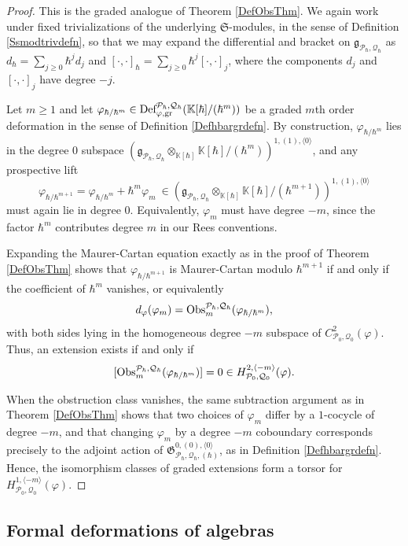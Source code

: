 \documentclass[11pt]{amsart}
\numberwithin{equation}{section}
\theoremstyle{definition}
\newcommand{\bb}{\mathbb}
\newcommand{\mc}{\mathcal}
\newcommand{\mf}{\mathfrak}
\newcommand{\Def}{{\textup{Def}}}
\newcommand{\Ph}{{\mathcal{P}_\hbar}}
\newcommand{\Qh}{{\mathcal{Q}_\hbar}}
\newcommand{\Kh}{{\K[\hbar]}}
\newcommand{\gd}{{\textup{gr}}}
\newcommand{\K}{{\bb K}}
\newcommand{\Obs}{{\textup{Obs}}}
\newcommand{\Ss}{{{\mf{S}}}}
\newcommand{\0}{{\textbf{0}}}
\newcommand{\g}{{\mf{g}}}
\def \mf{\mathfrak}
\begin{document}
\begin{proof}
	This is the graded analogue of Theorem \ref{DefObsThm}. We again work under fixed trivializations of the underlying $\Ss$-modules, in the sense of Definition \ref{Ssmodtrivdefn}, so that we may expand the differential and bracket on $\g_{\Ph,\Qh}$ as $d_\hbar=\sum_{j\ge 0}\hbar^j d_j$ and $[\cdot,\cdot]_\hbar = \sum_{j\ge 0}\hbar^j[\cdot,\cdot]_j$, where the components $d_j$ and $[\cdot,\cdot]_j$ have degree $-j$.
	
	Let $m\ge 1$ and let $\varphi_{\hbar/\hbar^m}\in \Def^{\Ph,\Qh}_{\varphi,\gd}(\Kh/(\hbar^m))$ be a graded $m$th order deformation in the sense of Definition \ref{Defhbargrdefn}. By construction,
	$\varphi_{\hbar/\hbar^m}$ lies in the degree $0$ subspace $(\g_{\Ph,\Qh}\otimes_{\Kh}\Kh/(\hbar^m))^{1,(1),\langle 0\rangle}$,
	and any prospective lift
	\[
	\varphi_{\hbar/\hbar^{m+1}}=\varphi_{\hbar/\hbar^m}+\hbar^m\varphi_m \ \in (\g_{\Ph,\Qh}\otimes_{\Kh}\Kh/(\hbar^{m+1}))^{1,(1),\langle 0\rangle}
	\]
 must again lie in degree $0$. Equivalently, $\varphi_m$ must have degree $-m$, since the factor $\hbar^m$ contributes degree $m$ in our Rees conventions.
	
	Expanding the Maurer-Cartan equation exactly as in the proof of Theorem \ref{DefObsThm} shows that
	$\varphi_{\hbar/\hbar^{m+1}}$ is Maurer-Cartan modulo $\hbar^{m+1}$ if and only if the coefficient
	of $\hbar^m$ vanishes, or equivalently
	\[
	d_\varphi(\varphi_m)=\Obs^{\Ph,\Qh}_m(\varphi_{\hbar/\hbar^m}),
	\]
	with both sides lying in the homogeneous degree $-m$ subspace of $C^2_{\mc P_0,\mc Q_0}(\varphi)$. Thus, an extension exists if and only if
	\[
	[\Obs^{\Ph,\Qh}_m(\varphi_{\hbar/\hbar^m})]=0\in H^{2,\langle -m \rangle}_{\mc P_0,\mc Q_0}(\varphi).
	\]
	
	When the obstruction class vanishes, the same subtraction argument as in Theorem \ref{DefObsThm} shows that two choices of $\varphi_m$ differ by a $1$-cocycle of degree $-m$, and that changing $\varphi_m$ by a degree $-m$ coboundary corresponds precisely to the adjoint action of $\mf G^{0,(0),\langle 0\rangle}_{\Ph,\Qh,(\hbar)}$, as in Definition \ref{Defhbargrdefn}. Hence, the isomorphism classes of graded extensions form a torsor for
	$H^{1,\langle -m\rangle}_{\mc P_0,\mc Q_0}(\varphi)$.
\end{proof}


\subsection{Formal deformations of algebras}\label{ssec:formal def}
\end{document}

